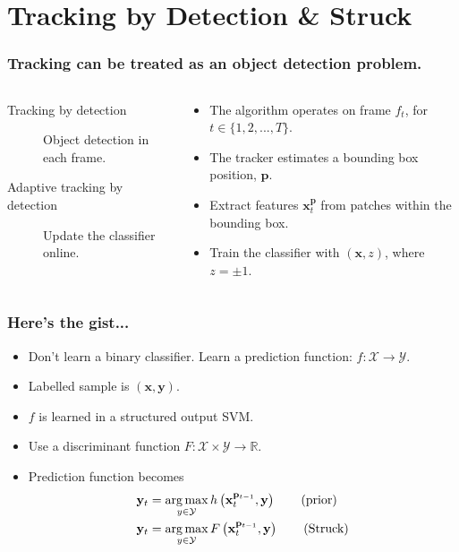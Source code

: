 \section{Tracking by Detection \& Struck}

\begin{frame}
    \frametitle{Tracking can be treated as an object detection problem.}
    \begin{columns}[T]
        \begin{column}{0.5\textwidth}
            \begin{description}
                \item [Tracking by detection] Object detection in each frame.
                \item [Adaptive tracking by detection] Update the classifier online.
            \end{description}
        \end{column}
        \begin{column}{0.5\textwidth}
            \begin{itemize}
                \item The algorithm operates on frame \(f_t\), for \(t \in \{1, 2, ..., T\}\).
                \item The tracker estimates a bounding box position, \(\mathbf{p}\).
                \item Extract features \(\mathbf{x}_t^\mathbf{p}\) from patches within the bounding box.
                \item Train the classifier with \((\mathbf{x}, z)\), where \(z = \pm1\).
            \end{itemize}
        \end{column}
    \end{columns}
\end{frame}

\begin{frame}
    \frametitle{Here's the gist...}
    \begin{itemize}
        \item Don't learn a binary classifier. Learn a prediction function: \(f :
            \mathcal{X} \rightarrow \mathcal{Y}\).
        \item Labelled sample is \((\mathbf{x}, \mathbf{y})\).
        \item \(f\) is learned in a structured output SVM.
        \item Use a discriminant function \(F: \mathcal{X} \times \mathcal{Y}
            \rightarrow \mathbb{R}\).
        \item Prediction function becomes %
            \begin{align}
                \mathbf{y}_t &= \operatorname*{arg\,max}\limits_{y \in \mathcal{Y}} h \left( \mathbf{x}_t^{\mathbf{p}_{t-1}}, \mathbf{y} \right) \tag{prior} \\
                \mathbf{y}_t &= \operatorname*{arg\,max}\limits_{y \in \mathcal{Y}} F \left( \mathbf{x}_t^{\mathbf{p}_{t-1}}, \mathbf{y} \right) \tag{Struck}
            \end{align}
    \end{itemize}
\end{frame}

